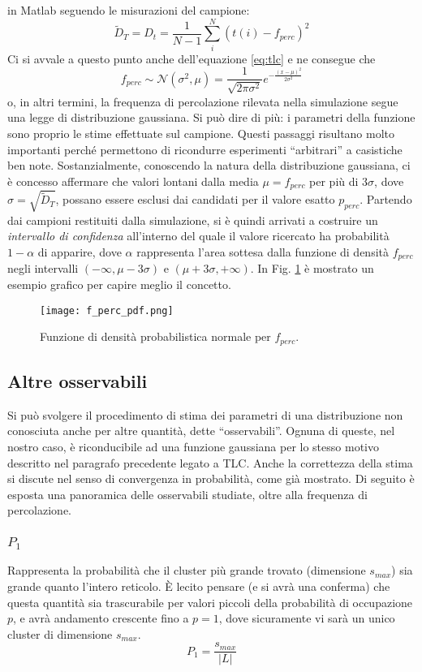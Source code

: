in Matlab seguendo le misurazioni del campione:
\begin{equation}
    \tilde{D}_T = D_t = \frac{1}{N-1} \sum_{i}^{N} \left(t(i) - f_{perc}\right)^2
\end{equation}
Ci si avvale a questo punto anche dell'equazione \ref{eq:tlc} e ne consegue che 
\begin{equation}
    f_{perc} \sim \mathcal{N}(\sigma^2, \mu) = \frac{1}{\sqrt{2\pi\sigma^2}} e^{-\frac{(x - \mu)^2}{2\sigma^2}}
\end{equation}
o, in altri termini, la frequenza di percolazione rilevata nella simulazione segue una legge 
di distribuzione gaussiana. 
Si può dire di più: i parametri della funzione sono proprio le stime effettuate sul campione.
Questi passaggi risultano molto importanti perché permettono di ricondurre
esperimenti ``arbitrari'' a casistiche ben note. Sostanzialmente, conoscendo la natura
della distribuzione gaussiana, ci è concesso affermare che valori lontani 
dalla media $\mu=f_{perc}$ per più di $3\sigma$, dove $\sigma=\sqrt{\tilde{D}_T}$, possano essere esclusi
dai candidati per il valore esatto $p_{perc}$. Partendo dai campioni restituiti dalla simulazione,
si è quindi arrivati a costruire un \textit{intervallo di confidenza} all'interno del quale il valore ricercato ha probabilità 
$1-\alpha$ di apparire, dove $\alpha$ rappresenta l'area sottesa dalla funzione di densità $f_{perc}$ negli intervalli $(-\infty, \mu - 3\sigma)$
e $(\mu + 3\sigma, +\infty)$.
In Fig. \ref{fig:f_perc_pdf} è mostrato un esempio grafico per capire meglio il concetto.
\begin{figure}[ht]
    \texttt{[image: f\_perc\_pdf.png]}
    \caption{Funzione di densità probabilistica normale per $f_{perc}$.}
    \label{fig:f_perc_pdf}
\end{figure}

\subsection*{Altre osservabili}
Si può svolgere il procedimento di stima dei parametri di una distribuzione non conosciuta anche per 
altre quantità, dette ``osservabili''. Ognuna di queste, nel nostro caso, è riconducibile ad una 
funzione gaussiana per lo stesso motivo descritto nel paragrafo precedente legato a TLC.
Anche la correttezza della stima si discute nel senso di convergenza in probabilità, come già mostrato.
Di seguito è esposta una panoramica delle osservabili studiate, oltre alla frequenza di percolazione.
\subsubsection*{$P_1$}
Rappresenta la probabilità che il cluster più grande trovato (dimensione $s_{max}$) sia grande 
quanto l'intero reticolo. È lecito pensare (e si avrà una conferma) che questa quantità sia 
trascurabile per valori piccoli della probabilità di occupazione $p$, e avrà andamento crescente
fino a $p=1$, dove sicuramente vi sarà un unico cluster di dimensione $s_{max}$.
\begin{equation}
    P_1=\frac{s_{max}}{|L|}
\end{equation}
